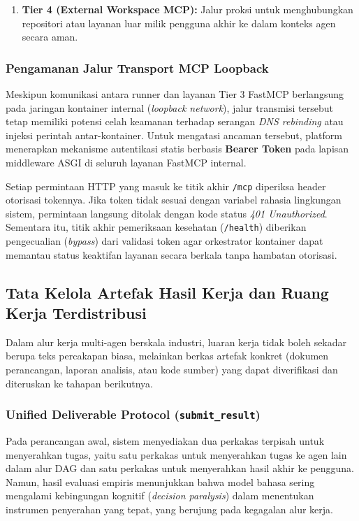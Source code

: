 \begin{enumerate}[label=\alph*.]
\begin{itemize}
      \item \texttt{kali-mcp}: Lingkungan audit keamanan berbasis kontainer Linux resmi yang menyediakan perkakas uji penetrasi terkurasi bagi agen bertipe analis keamanan.
    \end{itemize}
  \item \textbf{Tier 4 (External Workspace MCP):} Jalur proksi untuk menghubungkan repositori atau layanan luar milik pengguna akhir ke dalam konteks agen secara aman.
\end{enumerate}

\subsubsection{Pengamanan Jalur Transport MCP Loopback}
Meskipun komunikasi antara runner dan layanan Tier 3 FastMCP berlangsung pada jaringan kontainer internal (\textit{loopback network}), jalur transmisi tersebut tetap memiliki potensi celah keamanan terhadap serangan \textit{DNS rebinding} atau injeksi perintah antar-kontainer. Untuk mengatasi ancaman tersebut, platform menerapkan mekanisme autentikasi statis berbasis \textbf{Bearer Token} pada lapisan middleware ASGI di seluruh layanan FastMCP internal.

Setiap permintaan HTTP yang masuk ke titik akhir \texttt{/mcp} diperiksa header otorisasi tokennya. Jika token tidak sesuai dengan variabel rahasia lingkungan sistem, permintaan langsung ditolak dengan kode status \textit{401 Unauthorized}. Sementara itu, titik akhir pemeriksaan kesehatan (\texttt{/health}) diberikan pengecualian (\textit{bypass}) dari validasi token agar orkestrator kontainer dapat memantau status keaktifan layanan secara berkala tanpa hambatan otorisasi.

\subsection{Tata Kelola Artefak Hasil Kerja dan Ruang Kerja Terdistribusi}

Dalam alur kerja multi-agen berskala industri, luaran kerja tidak boleh sekadar berupa teks percakapan biasa, melainkan berkas artefak konkret (dokumen perancangan, laporan analisis, atau kode sumber) yang dapat diverifikasi dan diteruskan ke tahapan berikutnya.

\subsubsection{Unified Deliverable Protocol (\texttt{submit\_result})}
Pada perancangan awal, sistem menyediakan dua perkakas terpisah untuk menyerahkan tugas, yaitu satu perkakas untuk menyerahkan tugas ke agen lain dalam alur DAG dan satu perkakas untuk menyerahkan hasil akhir ke pengguna. Namun, hasil evaluasi empiris menunjukkan bahwa model bahasa sering mengalami kebingungan kognitif (\textit{decision paralysis}) dalam menentukan instrumen penyerahan yang tepat, yang berujung pada kegagalan alur kerja.

